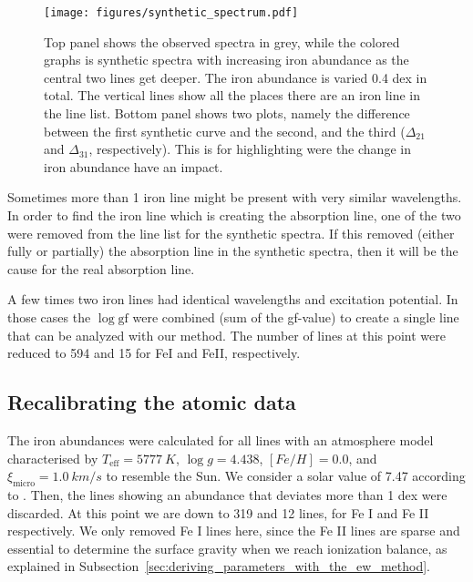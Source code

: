 \documentclass{aa}
\begin{document}
\begin{figure}[tpb]
    \centering
    \texttt{[image: figures/synthetic\_spectrum.pdf]}
    \caption{Top panel shows the observed spectra in grey, while
        the colored graphs is synthetic spectra with increasing iron
        abundance as the central two lines get deeper. The iron abundance
        is varied 0.4 dex in total. The vertical lines show all the places
        there are an iron line in the line list. Bottom panel shows
        two plots, namely the difference between the first synthetic curve
        and the second, and the third ($\Delta_{21}$ and $\Delta_{31}$,
        respectively). This is for highlighting were the change in iron
        abundance have an impact.}
    \label{fig:synthesis}
\end{figure}


Sometimes more than 1 iron line might be present with very similar
wavelengths. In order to find the iron line which is creating the
absorption line, one of the two were removed from the line list for
the synthetic spectra. If this removed (either fully or partially) the
absorption line in the synthetic spectra, then it will be the cause for
the real absorption line.

A few times two iron lines had identical wavelengths and excitation
potential. In those cases the $\log \mathrm{gf}$ were combined (sum of
the gf-value) to create a single line that can be analyzed with our
method. The number of lines at this point were reduced to 594 and 15 for
FeI and FeII, respectively.


\subsection{Recalibrating the atomic data}
\label{ssub:Recalibrating-the-atomic-data}

The iron abundances were calculated for all lines with an atmosphere
model characterised by $T_\mathrm{eff}=\SI{5777}{K}$, $\log g =
4.438$, $[Fe/H] = 0.0$, and $\xi_\mathrm{micro} = \SI{1.0}{km/s}$
to resemble the Sun. We consider a solar value of 7.47 according to
\cite{Gonzales2000}. Then, the lines showing an abundance that deviates
more than 1 dex were discarded. At this point we are down to 319 and
12 lines, for Fe I and Fe II respectively. We only removed Fe I lines
here, since the Fe II lines are sparse and essential to determine the
surface gravity when we reach ionization balance, as explained in
Subsection~\ref{sec:deriving_parameters_with_the_ew_method}.
\end{document}
